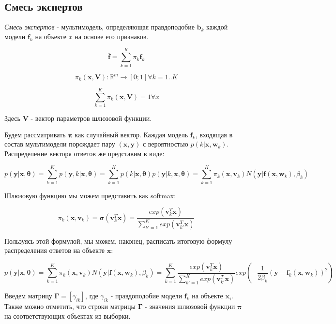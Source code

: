 \documentclass[12pt,twoside]{article}
\begin{document}
\subsection{Смесь экспертов}

\begin{Def}
     \emph{Смесь экспертов} - мультимодель, определяющая правдоподобие
 $\boldsymbol{b}_k$ каждой модели $\mathbf{f}_k$ на объекте $x$ на основе его признаков.
\end{Def}

$$ \overline{\mathbf{f}} = \sum\limits_{k=1}^K \pi_k \mathbf{f}_k$$

$$\pi_k (\mathbf{x}, \mathbf{V}): \mathbb{R}^m \rightarrow [0; 1] \forall k = 1..K$$

$$\sum\limits_{k=1}^K \pi_k(\mathbf{x}, \mathbf{V}) = 1 \forall x$$

Здесь $\mathbf{V}$ - вектор параметров шлюзовой функции.

Будем рассматривать $\boldsymbol{\pi}$ как случайный вектор. Каждая модель $\mathbf{f}_k$, входящая в состав мультимодели порождает пару $(\mathbf{x}, \mathbf{y})$ с вероятностью $p(k | \mathbf{x}, \mathbf{w}_k)$. Распределение векторя ответов же представим в виде:

$$ p(\mathbf{y} | \mathbf{x}, \boldsymbol{\theta}) = \sum\limits_{k=1}^K p(\mathbf{y}, k | \mathbf{x}, \boldsymbol{\theta}) = 
\sum\limits_{k=1}^K p(k| \mathbf{x}, \boldsymbol{\theta}) p(\mathbf{y}| k, \mathbf{x}, \boldsymbol{\theta}) =
\sum\limits_{k=1}^K \pi_k (\mathbf{x}, \mathbf{v}_k) N(\mathbf{y} | \mathbf{f}(\mathbf{x}, \mathbf{w}_k), \beta_k )
$$

Шлюзовую функцию мы можем представить как softmax:

$$ \pi_k  (\mathbf{x}, \mathbf{v}_k) = \boldsymbol{\sigma} (\mathbf{v}_k^T \mathbf{x}) = \frac{
exp(\mathbf{v}_k^T \mathbf{x}) }{\sum\limits_{k' =1}^{K}exp(\mathbf{v}_{k'}^T \mathbf{x})}$$

Пользуясь этой формулой, мы можем, наконец, расписать итоговую формулу  распределения ответов на объекте $\mathbf{x}$:

$$ p(\mathbf{y} | \mathbf{x}, \boldsymbol{\theta}) = 
\sum\limits_{k=1}^K \pi_k (\mathbf{x}, \mathbf{v}_k) N(\mathbf{y} | \mathbf{f}(\mathbf{x}, \mathbf{w}_k), \beta_k )  =
\sum\limits_{k=1}^{K} \frac{
exp(\mathbf{v}_k^T \mathbf{x}) }{\sum\limits_{k' =1}^{K}exp(\mathbf{v}_{k'}^T \mathbf{x})} exp\left(-\frac{1}{2\beta_k}(\mathbf{y} -
\mathbf{f}_k (\mathbf{x}, \mathbf{w}_k)
 )^2\right)
 $$

Введем матрицу $\boldsymbol{\Gamma} = [\gamma_{ik}]$, где $\gamma_{ik}$ - правдоподобие модели $\mathbf{f}_k$ на объекте $\mathbf{x}_i$. Также можно отметить,  что строки матрицы $\boldsymbol{\Gamma}$ - значения шлюзовой функции $\boldsymbol{\pi}$ на соответствующих объектах из выборки.
\end{document}
